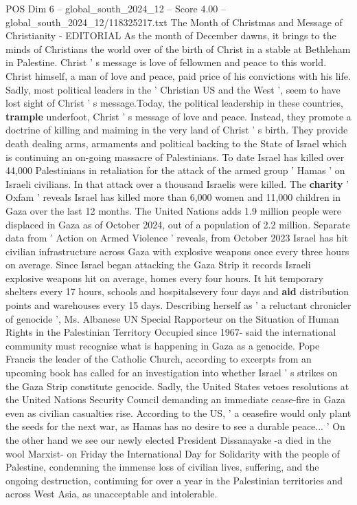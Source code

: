 \begin{textsample}{POS Dim 6 – global\_south\_2024\_12 – Score 4.00 – global\_south\_2024\_12/118325217.txt}  \label{ex:f6_pos_324}
The Month of Christmas and Message of Christianity - EDITORIAL As the month of December dawns, it brings to the minds of Christians the world over of the birth of Christ in a stable at Bethleham in Palestine.
Christ ' s message is love of fellowmen and peace to this world.
Christ himself, a man of love and peace, paid price of his convictions with his life.
Sadly, most political leaders in the ' Christian US and the West ', seem to have lost sight of Christ ' s message.Today, the political leadership in these countries, \textbf{trample} underfoot, Christ ' s message of love and peace.
Instead, they promote a doctrine of killing and maiming in the very land of Christ ' s birth.
They provide death dealing arms, armaments and political backing to the State of Israel which is continuing an on-going massacre of Palestinians.
To date Israel has killed over 44,000 Palestinians in retaliation for the attack of the armed group ' Hamas ' on Israeli civilians.
In that attack over a thousand Israelis were killed.
The \textbf{charity} ' Oxfam ' reveals Israel has killed more than 6,000 women and 11,000 children in Gaza over the last 12 months.
The United Nations adds 1.9 million people were displaced in Gaza as of October 2024, out of a population of 2.2 million.
Separate data from ' Action on Armed Violence ' reveals, from October 2023 Israel has hit civilian infrastructure across Gaza with explosive weapons once every three hours on average.
Since Israel began attacking the Gaza Strip it records Israeli explosive weapons hit on average, homes every four hours.
It hit temporary shelters every 17 hours, schools and hospitalsevery four days and \textbf{aid} distribution points and warehouses every 15 days.
Describing herself as ' a reluctant chronicler of genocide ', Ms.
Albanese UN Special Rapporteur on the Situation of Human Rights in the Palestinian Territory Occupied since 1967- said the international community must recognise what is happening in Gaza as a genocide.
Pope Francis the leader of the Catholic Church, according to excerpts from an upcoming book has called for an investigation into whether Israel ' s strikes on the Gaza Strip constitute genocide.
Sadly, the United States vetoes resolutions at the United Nations Security Council demanding an immediate cease-fire in Gaza even as civilian casualties rise.
According to the US, ' a ceasefire would only plant the seeds for the next war, as Hamas has no desire to see a durable peace... ' On the other hand we see our newly elected President Dissanayake -a died in the wool Marxist- on Friday the International Day for Solidarity with the people of Palestine, condemning the immense loss of civilian lives, suffering, and the ongoing destruction, continuing for over a year in the Palestinian territories and across West Asia, as unacceptable and intolerable.

\end{textsample}
